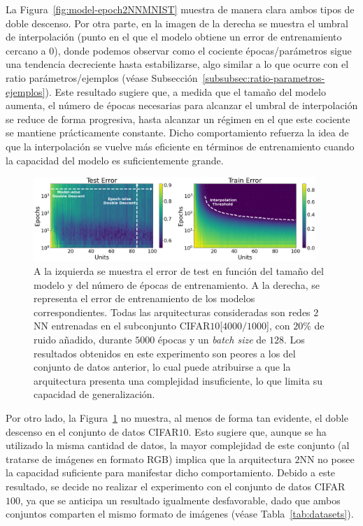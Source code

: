 La Figura~\ref{fig:model-epoch2NNMNIST} muestra de manera clara ambos tipos de doble descenso. Por otra parte, en la imagen de la derecha se muestra el umbral de interpolación (punto en el que el modelo obtiene un error de entrenamiento cercano a $0$), donde podemos observar como el cociente épocas/parámetros sigue una tendencia decreciente hasta estabilizarse, algo similar a lo que ocurre con el ratio parámetros/ejemplos (véase Subsección~\ref{subsubsec:ratio-parametros-ejemplos}). Este resultado sugiere que, a medida que el tamaño del modelo aumenta, el número de épocas necesarias para alcanzar el umbral de interpolación se reduce de forma progresiva, hasta alcanzar un régimen en el que este cociente se mantiene prácticamente constante. Dicho comportamiento refuerza la idea de que la interpolación se vuelve más eficiente en términos de entrenamiento cuando la capacidad del modelo es suficientemente grande.

\begin{figure}[h]
    \centering
    \includegraphics[width=0.95\textwidth]{img/experiments/model-epoch2NNCIFAR10.png}
    \caption[Error en entrenamiento y test en función del tamaño del modelo y del número de épocas para la red $2$NN y un subconjunto de CIFAR$10$.]{A la izquierda se muestra el error de test en función del tamaño del modelo y del número de épocas de entrenamiento. A la derecha, se representa el error de entrenamiento de los modelos correspondientes. Todas las arquitecturas consideradas son redes $2$NN entrenadas en el subconjunto CIFAR$10$[$4000/1000$], con $20\%$ de ruido añadido, durante $5000$ épocas y un \textit{batch size} de $128$. Los resultados obtenidos en este experimento son peores a los del conjunto de datos anterior, lo cual puede atribuirse a que la arquitectura presenta una complejidad insuficiente, lo que limita su capacidad de generalización.}\label{fig:model-epoch2NNCIFAR10}
\end{figure}

Por otro lado, la Figura~\ref{fig:model-epoch2NNCIFAR10} no muestra, al menos de forma tan evidente, el doble descenso en el conjunto de datos CIFAR$10$. Esto sugiere que, aunque se ha utilizado la misma cantidad de datos, la mayor complejidad de este conjunto (al tratarse de imágenes en formato RGB) implica que la arquitectura $2$NN no posee la capacidad suficiente para manifestar dicho comportamiento. Debido a este resultado, se decide no realizar el experimento con el conjunto de datos CIFAR$100$, ya que se anticipa un resultado igualmente desfavorable, dado que ambos conjuntos comparten el mismo formato de imágenes (véase Tabla~\ref{tab:datasets}).

